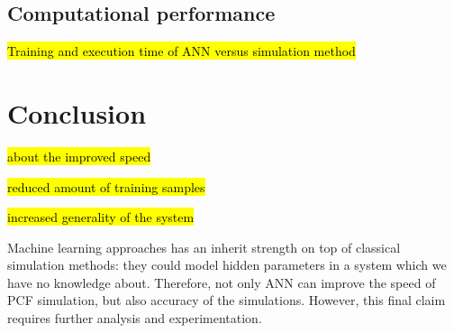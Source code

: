 \documentclass[draft, a4, 10pt, onecolumn]{IEEEtran}
\begin{document}
\subsection{Computational performance}

\hl{Training and execution time of ANN versus simulation method}


\section{Conclusion}
\label{sec:conc}

\hl{about the improved speed}

\hl{reduced amount of training samples}

\hl{increased generality of the system}

Machine learning approaches has an inherit strength on top of classical simulation methods: they could model hidden parameters in a system which we have no knowledge about. Therefore, not only ANN can improve the speed of PCF simulation, but also accuracy of the simulations. However, this final claim requires further analysis and experimentation.
	
\end{document}
